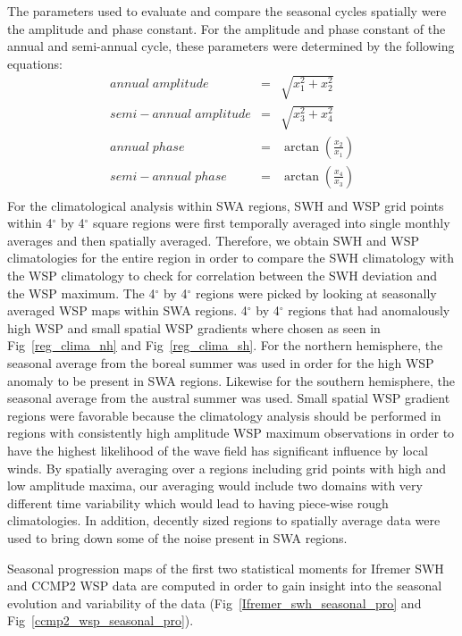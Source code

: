 \documentclass[draft,linenumbers]{agujournal2018}
\begin{document}
The parameters used to evaluate and compare the seasonal cycles spatially were the amplitude and phase constant. For the amplitude and phase constant of the annual and semi-annual cycle, these parameters were determined by the following equations:
 \begin{eqnarray}
     annual\;amplitude & = & \sqrt{x_1^{2} + x_2^{2}}\\
    semi-annual\;amplitude & = & \sqrt{x_3^{2} + x_4^{2}}\\
     annual\;phase & = & \arctan{\left(\frac{x_2}{x_1}\right)} \\
    semi-annual\;phase & = & \arctan{\left(\frac{x_4}{x_3}\right)}\\
 \end{eqnarray}
For the climatological analysis within SWA regions, SWH and WSP grid points within 4$^{\circ}$ by 4$^{\circ}$ square regions were first temporally averaged into single monthly averages and then spatially averaged. Therefore, we obtain SWH and WSP climatologies for the entire region in order to compare the SWH climatology with the WSP climatology to check for correlation between the SWH deviation and the WSP maximum. The 4$^{\circ}$ by 4$^{\circ}$ regions were picked by looking at seasonally averaged WSP maps within SWA regions. 4$^{\circ}$ by 4$^{\circ}$ regions that had anomalously high WSP and small spatial WSP gradients where chosen as seen in Fig~\ref{reg_clima_nh} and Fig~\ref{reg_clima_sh}. For the northern hemisphere, the seasonal average from the boreal summer was used in order for the high WSP anomaly to be present in SWA regions. Likewise for the southern hemisphere, the seasonal average from the austral summer was used. Small spatial WSP gradient regions were favorable because the climatology analysis should be performed in regions with consistently high amplitude WSP maximum observations in order to have the highest likelihood of the wave field has significant influence by local winds. By spatially averaging over a regions including grid points with high and low amplitude maxima, our averaging would include two domains with very different time variability which would lead to having piece-wise rough climatologies. In addition, decently sized regions to spatially average data were used to bring down some of the noise present in SWA regions.  


Seasonal progression maps of the first two statistical moments for Ifremer SWH and CCMP2 WSP data are computed in order to gain insight into the seasonal evolution and variability of the data (Fig~\ref{Ifremer_swh_seasonal_pro} and Fig~\ref{ccmp2_wsp_seasonal_pro}).
\end{document}
